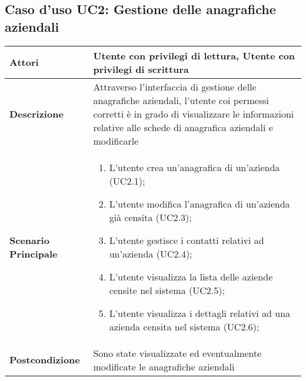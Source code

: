	\subsection{Caso d'uso UC2: Gestione delle anagrafiche aziendali}
	\begin{longtable}{ | p{2.7cm} | p{12cm} |}
		\hline \textbf{Attori} & Utente con privilegi di lettura, Utente con privilegi di scrittura\\ 
		\hline \textbf{Descrizione} & Attraverso l’interfaccia di gestione delle anagrafiche aziendali, l’utente coi permessi corretti è in grado di visualizzare le informazioni relative alle schede di anagrafica aziendali e modificarle\\ 
		\hline \textbf{Scenario Principale} & \begin{enumerate}
			\item L’utente crea un’anagrafica di un’azienda  (UC2.1);
			\item L’utente modifica l’anagrafica di un’azienda già censita  (UC2.3);
			\item L’utente gestisce i contatti relativi ad un’azienda  (UC2.4);
			\item L’utente visualizza la lista delle aziende censite nel sistema  (UC2.5);
			\item L’utente visualizza i dettagli relativi ad una azienda censita nel sistema  (UC2.6);
			
		\end{enumerate}
		\\ 
		\hline \textbf{Postcondizione} & Sono state visualizzate ed eventualmente modificate le anagrafiche aziendali\\ 
		\hline 
	\end{longtable}
	
	\hypertarget{UC2.4}{}
